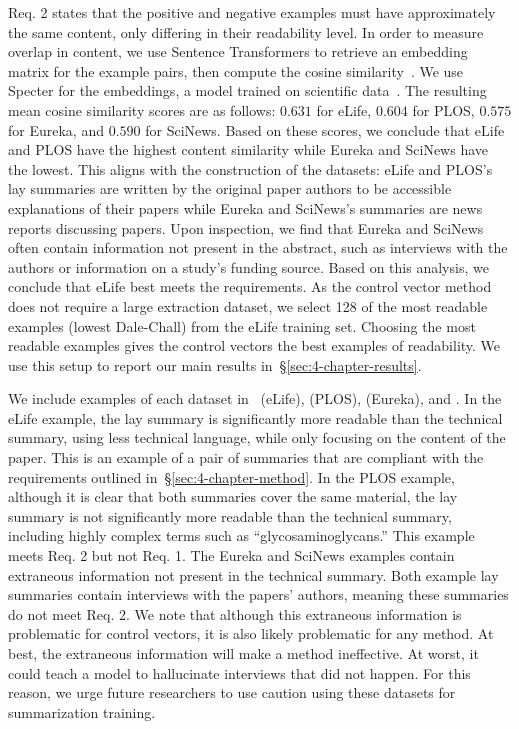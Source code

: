 Req. 2 states that the positive and negative examples must have approximately the same content, only differing in their readability level. In order to measure overlap in content, we use Sentence Transformers to retrieve an embedding matrix for the example pairs, then compute the cosine similarity~\cite{reimers-gurevych-2019-sentence}. We use Specter for the embeddings, a model trained on scientific data~\cite{cohan-etal-2020-specter}. The resulting mean cosine similarity scores are as follows: $0.631$ for eLife, $0.604$ for PLOS, $0.575$ for Eureka, and $0.590$ for SciNews. Based on these scores, we conclude that eLife and PLOS have the highest content similarity while Eureka and SciNews have the lowest. This aligns with the construction of the datasets: eLife and PLOS's lay summaries are written by the original paper authors to be accessible explanations of their papers while Eureka and SciNews's summaries are news reports discussing papers. Upon inspection, we find that Eureka and SciNews often contain information not present in the abstract, such as interviews with the authors or information on a study's funding source. 
Based on this analysis, we conclude that eLife best meets the requirements. As the control vector method does not require a large extraction dataset, we select 128 of the most readable examples (lowest Dale-Chall) from the eLife training set. Choosing the most readable examples gives the control vectors the best examples of readability. We use this setup to report our main results in~\S\ref{sec:4-chapter-results}. 




We include examples of each dataset in~ (eLife),  (PLOS),  (Eureka), and . In the eLife example, the lay summary is significantly more readable than the technical summary, using less technical language, while only focusing on the content of the paper. This is an example of a pair of summaries that are compliant with the requirements outlined in~\S\ref{sec:4-chapter-method}. In the PLOS example, although it is clear that both summaries cover the same material, the lay summary is not significantly more readable than the technical summary, including highly complex terms such as ``glycosaminoglycans.'' This example meets Req. 2 but not Req. 1. The Eureka and SciNews examples contain extraneous information not present in the technical summary. Both example lay summaries contain interviews with the papers' authors, meaning these summaries do not meet Req. 2. We note that although this extraneous information is problematic for control vectors, it is also likely problematic for any method. At best, the extraneous information will make a method ineffective. At worst, it could teach a model to hallucinate interviews that did not happen. For this reason, we urge future researchers to use caution using these datasets for summarization training.

